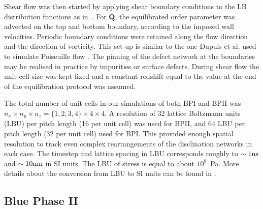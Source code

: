 \documentclass[12pt,twoside]{iopart}
\begin{document}
Shear flow was then started by applying shear boundary conditions to the LB distribution functions as in~\cite{Denniston:2004}. For ${\mathbf Q}$, the equilibrated order parameter was advected on the top and bottom boundary, according to the imposed wall velocities. Periodic boundary conditions were retained along the flow direction and the direction of vorticity.
This set-up is similar to the one Dupuis et al. used to simulate Poiseuille flow \cite{Dupuis:2005}. The pinning of the defect network at the boundaries may be realised in practice by impurities or surface defects.
During shear flow the unit cell size was kept fixed and a constant redshift equal to the value at the end of the equilibration protocol was assumed.

The total number of unit cells in our simulations of both BPI and BPII
was $n_x\times n_y \times n_z= \{1,2,3,4\} \times 4\times 4$.
A resolution of 32 lattice Boltzmann units (LBU) per pitch length
(16 per unit cell) was used for BPII, and 64 LBU per pitch length
(32 per unit cell) used for BPI.  
This provided enough spatial resolution to track even complex rearrangements
of the disclination networks in each case.
The timestep and lattice spacing in LBU corresponds roughly to
$\sim 1 {\rm ns}$ and $\sim 10{\rm nm}$ in SI units. The LBU of stress
is equal to about $10^8$~Pa. 
More details about the conversion from LBU to SI units can be found in
\cite{Henrich:2010b,Henrich:2011a}.

\subsection{Blue Phase II}\label{sec_bpii}
\end{document}

